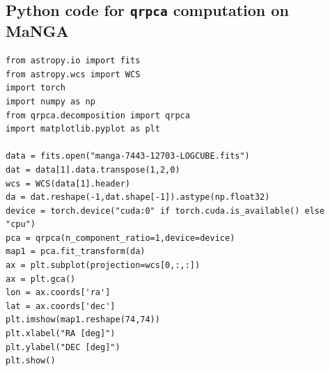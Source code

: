 \documentclass[preprint,authoryear,11pt,5p,times]{elsarticle}
\begin{document}
\subsection*{Python code for \texttt{qrpca} computation on MaNGA}

\begin{lstlisting}
from astropy.io import fits
from astropy.wcs import WCS
import torch
import numpy as np
from qrpca.decomposition import qrpca
import matplotlib.pyplot as plt

data = fits.open("manga-7443-12703-LOGCUBE.fits")
dat = data[1].data.transpose(1,2,0)
wcs = WCS(data[1].header)
da = dat.reshape(-1,dat.shape[-1]).astype(np.float32)
device = torch.device("cuda:0" if torch.cuda.is_available() else "cpu")
pca = qrpca(n_component_ratio=1,device=device)
map1 = pca.fit_transform(da)
ax = plt.subplot(projection=wcs[0,:,:])
ax = plt.gca()
lon = ax.coords['ra']
lat = ax.coords['dec']
plt.imshow(map1.reshape(74,74))
plt.xlabel("RA [deg]")
plt.ylabel("DEC [deg]")     
plt.show()
\end{lstlisting}




\end{document}
